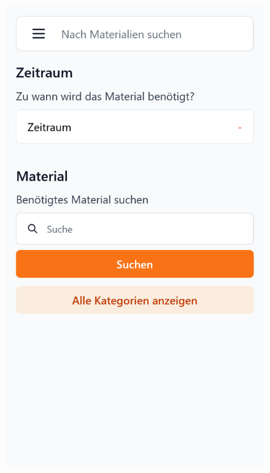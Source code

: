 \begin{figure}[p]
    \includegraphics[scale=0.17]{Bilder/Dialgobeispiel/Suiche2.png} \hspace{1em}

\end{figure}
